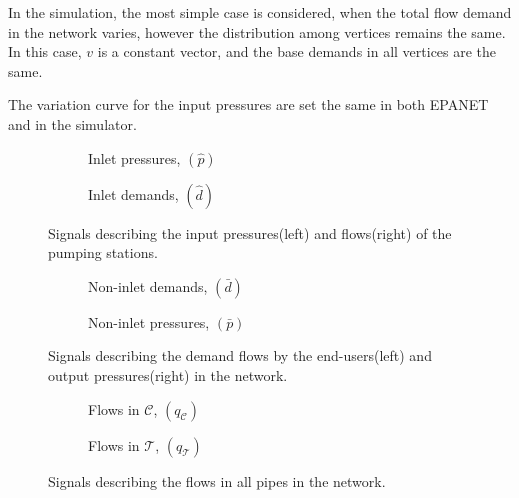 In the simulation, the most simple case is considered, when the total flow demand in the network varies, however the distribution among vertices remains the same. In this case, $v$ is a constant vector, and the base demands in all vertices are the same. 

The variation curve for the input pressures are set the same in both EPANET and in the simulator. 

\begin{figure}[H]
\centering
\begin{subfigure}{.49\textwidth}
\centering
   
  \caption{Inlet pressures, $(\hat{p})$}
  \label{fig:sub11_example1}
\end{subfigure}
\begin{subfigure}{.49\textwidth}
\centering
   
  \caption{Inlet demands, $(\hat{d})$}
  \label{fig:sub22_example1}
\end{subfigure}
\caption{Signals describing the input pressures(left) and flows(right) of the pumping stations.}
\label{fig:inlet_pressures_demands}
\end{figure}

\begin{figure}[H]
\centering
\begin{subfigure}{.49\textwidth}
\centering
   
  \caption{Non-inlet demands, $(\bar{d})$}
  \label{fig:sub21_example1}
\end{subfigure}
\begin{subfigure}{.49\textwidth}
\centering
   
  \caption{Non-inlet pressures, $(\bar{p})$}
  \label{fig:sub22_example1}
\end{subfigure}
\caption{Signals describing the demand flows by the end-users(left) and output pressures(right) in the network.}
\label{fig:noninlet_demands_noninlet_pressures}
\end{figure}

\begin{figure}[H]
\centering
\begin{subfigure}{.49\textwidth}
\centering
   
  \caption{Flows in $\mathcal{C}$, $(q_{\mathcal{C}})$}
  \label{fig:sub31_example1}
\end{subfigure}
\begin{subfigure}{.49\textwidth}
\centering
   
  \caption{Flows in $\mathcal{T}$, $(q_{\mathcal{T}})$}
  \label{fig:sub31_example1}
\end{subfigure}
\caption{Signals describing the flows in all pipes in the network.}
\label{fig:flows_C_T}
\end{figure}

